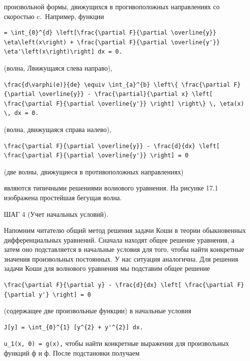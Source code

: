 \documentclass[
  ukrainian,
]{article}
\begin{document}
произвольной формы, движущихся в прогивоположных направлениях со
скоростью c.~Например, функции

\begin{verbatim}
= \int_{0}^{d} \left[\frac{\partial F}{\partial \overline{y}} \eta\left(x\right) + \frac{\partial F}{\partial \overline{y'}} \eta'\left(x\right)\right] dx = 0.
\end{verbatim}

(волна, Лвижущаяся слева направо),

\begin{verbatim}
\frac{d\varphi(e)}{de} \equiv \int_{a}^{b} \left\{ \frac{\partial F}{\partial \overline{y}} - \frac{\partial}{\partial x} \left[ \frac{\partial F}{\partial \overline{y'}} \right] \right\} \, \eta(x) \, dx = 0.
\end{verbatim}

(волна, движущаяся справа налево),

\begin{verbatim}
\frac{\partial F}{\partial \overline{y}} - \frac{d}{dx} \left[ \frac{\partial F}{\partial \overline{y'}} \right] = 0
\end{verbatim}

(две волны, движущиеся в противоположных направлениях)

являются типичными решениями волиового уравнения. На рисунке 17.1
изображена простейшая бегущая волна.

ШАГ 4 (Учет начальных условий).

Напомним читателю общий метод решения задачи Коши в теории обыкновенных
дифференциальных уравнений. Сначала находят общее решение уравнения, а
затем оно подставляется в начальные условия для того, чтобы найти
конкретные значения произвольных постоянных. У нас ситуация аналогична.
Для решения задачи Коши для волнового уравнения мы подставим общее
решение

\begin{verbatim}
\frac{\partial F}{\partial y} - \frac{d}{dx} \left[ \frac{\partial F}{\partial y'} \right] = 0
\end{verbatim}

(содержащее две произвольные функции) в начальные условия

\begin{verbatim}
J[y] = \int_{0}^{1} [y^{2} + y'^{2}] dx.
\end{verbatim}

\texttt{u\_1(x,\ 0)\ =\ g(x),} чтобы найти конкретные выражения для
произвольных функций ф и ф. После подстановки получаем
\end{document}
